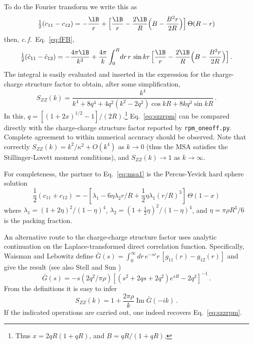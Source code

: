 \documentclass[12pt,a4paper]{article}
\DeclareMathOperator{\imaginary}{Im}
\newcommand{\latin}[1]{\emph{#1}}
\newcommand{\cf}{\latin{c.\,f.}}
\newcommand{\half}{{\textstyle\frac{1}{2}}}
\newcommand{\Eqref}[1]{Eq.~\eqref{#1}}
\begin{document}
To do the Fourier transform we write this as
%
\begin{equation}
  \half(c_{11}-c_{12})=-\frac{\lB}{r}+\Bigl[\frac{\lB}{r}
    -\frac{2\lB}{R}\Bigl(B-\frac{B^2 r}{2R}\Bigr)\Bigr]\,\Theta(R-r)
  \label{eq:msa1}
\end{equation}
%
then, \cf\ \Eqref{eq:fFB},
%
\begin{equation}
  \half(\tilde c_{11}-\tilde c_{12})=-\frac{4\pi\lB}{k^2}+
  \frac{4\pi}{k}\int_0^R\!dr\,r\,\sin kr\,\Bigl[\frac{\lB}{r}
  -\frac{2\lB}{R}\Bigl(B-\frac{B^2 r}{2R}\Bigr)\Bigr]\,.
\end{equation}
%
The integral is easily evaluated and inserted in the expression
for the charge-charge structure factor to obtain, after some
simplification,
%
\begin{equation}
  S_{ZZ}(k)=\frac{k^4}{k^4+8q^4+4q^2(k^2-2q^2)\cos kR+8kq^3\sin kR}\,.
  \label{eq:szzrpm}
\end{equation}
%
In this, $q=[(1+2x)^{1/2}-1]/(2R)$.\footnote{Thus $x=2qR(1+qR)$, and
  $B=qR/(1+qR)$.}  \Eqref{eq:szzrpm} can be compared directly with the
charge-charge structure factor reported by \verb+rpm_oneoff.py+.
Complete agreement to within numerical accuracy should be observed.
Note that correctly $S_{ZZ}(k)=k^2/\kappa^2+O(k^4)$ as $k\to0$ (thus
the MSA satisfies the Stillinger-Lovett moment conditions), and
$S_{ZZ}(k)\to1$ as $k\to\infty$.

For completeness, the partner to \Eqref{eq:msa1} is the Percus-Yevick
hard sphere solution \cite{HM06, Wert63}
%
\begin{equation}
  \half(c_{11}+c_{12})=
  -[\lambda_1-6\eta\lambda_2r/R
  +\half\eta\lambda_1(r/R)^3]\,\Theta(1-x)
  \label{eq:msa2}
\end{equation}
%
where $\lambda_1=(1+2\eta)^2/(1-\eta)^4$,
$\lambda_2=(1+\half\eta)^2/(1-\eta)^4$, and $\eta=\pi\rho R^3/6$ is
the packing fraction.

An alternative route to the charge-charge structure factor uses
analytic continuation on the Laplace-transformed direct correlation
function.  Specifically, Waisman and Lebowitz \cite{WL72} define $\bar
G(s)=\int_0^\infty dr\,e^{-sr} r\, [g_{11}(r)-g_{12}(r)]$ and give the
result (see also Stell and Sun \cite{SS75})
%
\begin{equation}
  \bar G(s)=-s(2q^2/\pi\rho)[(s^2+2qs+2q^2)e^{sR}-2q^2]^{-1}\,.
\end{equation}
%
From the definitions it is easy to infer
%
\begin{equation}
  S_{ZZ}(k)=1+\frac{2\pi\rho}{k}\imaginary \bar G(-ik)\,.
\end{equation}
%
If the indicated operations are carried out, one indeed recovers
\Eqref{eq:szzrpm}.
\end{document}
